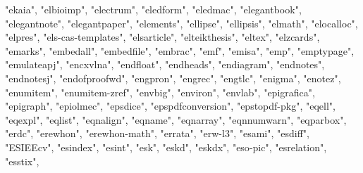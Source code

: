 \documentclass[
]{article}
\newenvironment{Shaded}{\begin{snugshade}}{\end{snugshade}}
\newcommand{\NormalTok}[1]{#1}
\newcommand{\StringTok}[1]{\textcolor[rgb]{0.31,0.60,0.02}{#1}}
\begin{document}
\begin{Shaded}
\begin{Highlighting}[]
\StringTok{"ekaia"}\NormalTok{, }\StringTok{"elbioimp"}\NormalTok{, }\StringTok{"electrum"}\NormalTok{, }\StringTok{"eledform"}\NormalTok{, }\StringTok{"eledmac"}\NormalTok{, }\StringTok{"elegantbook"}\NormalTok{, }
\StringTok{"elegantnote"}\NormalTok{, }\StringTok{"elegantpaper"}\NormalTok{, }\StringTok{"elements"}\NormalTok{, }\StringTok{"ellipse"}\NormalTok{, }\StringTok{"ellipsis"}\NormalTok{, }
\StringTok{"elmath"}\NormalTok{, }\StringTok{"elocalloc"}\NormalTok{, }\StringTok{"elpres"}\NormalTok{, }\StringTok{"els{-}cas{-}templates"}\NormalTok{, }\StringTok{"elsarticle"}\NormalTok{, }
\StringTok{"elteikthesis"}\NormalTok{, }\StringTok{"eltex"}\NormalTok{, }\StringTok{"elzcards"}\NormalTok{, }\StringTok{"emarks"}\NormalTok{, }\StringTok{"embedall"}\NormalTok{, }\StringTok{"embedfile"}\NormalTok{, }
\StringTok{"embrac"}\NormalTok{, }\StringTok{"emf"}\NormalTok{, }\StringTok{"emisa"}\NormalTok{, }\StringTok{"emp"}\NormalTok{, }\StringTok{"emptypage"}\NormalTok{, }\StringTok{"emulateapj"}\NormalTok{, }\StringTok{"encxvlna"}\NormalTok{, }
\StringTok{"endfloat"}\NormalTok{, }\StringTok{"endheads"}\NormalTok{, }\StringTok{"endiagram"}\NormalTok{, }\StringTok{"endnotes"}\NormalTok{, }\StringTok{"endnotesj"}\NormalTok{, }
\StringTok{"endofproofwd"}\NormalTok{, }\StringTok{"engpron"}\NormalTok{, }\StringTok{"engrec"}\NormalTok{, }\StringTok{"engtlc"}\NormalTok{, }\StringTok{"enigma"}\NormalTok{, }\StringTok{"enotez"}\NormalTok{, }
\StringTok{"enumitem"}\NormalTok{, }\StringTok{"enumitem{-}zref"}\NormalTok{, }\StringTok{"envbig"}\NormalTok{, }\StringTok{"environ"}\NormalTok{, }\StringTok{"envlab"}\NormalTok{, }\StringTok{"epigrafica"}\NormalTok{, }
\StringTok{"epigraph"}\NormalTok{, }\StringTok{"epiolmec"}\NormalTok{, }\StringTok{"epsdice"}\NormalTok{, }\StringTok{"epspdfconversion"}\NormalTok{, }\StringTok{"epstopdf{-}pkg"}\NormalTok{, }
\StringTok{"eqell"}\NormalTok{, }\StringTok{"eqexpl"}\NormalTok{, }\StringTok{"eqlist"}\NormalTok{, }\StringTok{"eqnalign"}\NormalTok{, }\StringTok{"eqname"}\NormalTok{, }\StringTok{"eqnarray"}\NormalTok{, }
\StringTok{"eqnnumwarn"}\NormalTok{, }\StringTok{"eqparbox"}\NormalTok{, }\StringTok{"erdc"}\NormalTok{, }\StringTok{"erewhon"}\NormalTok{, }\StringTok{"erewhon{-}math"}\NormalTok{, }
\StringTok{"errata"}\NormalTok{, }\StringTok{"erw{-}l3"}\NormalTok{, }\StringTok{"esami"}\NormalTok{, }\StringTok{"esdiff"}\NormalTok{, }\StringTok{"ESIEEcv"}\NormalTok{, }\StringTok{"esindex"}\NormalTok{, }
\StringTok{"esint"}\NormalTok{, }\StringTok{"esk"}\NormalTok{, }\StringTok{"eskd"}\NormalTok{, }\StringTok{"eskdx"}\NormalTok{, }\StringTok{"eso{-}pic"}\NormalTok{, }\StringTok{"esrelation"}\NormalTok{, }\StringTok{"esstix"}\NormalTok{, }

\end{Highlighting}
\end{Shaded}
\end{document}
